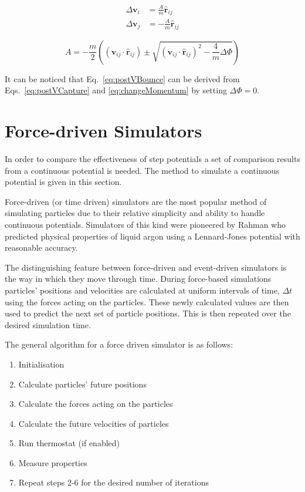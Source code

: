 \documentclass[12pt]{UoAthesis}
\begin{document}
\begin{subequations}
  \label{eq:postVCapture}
  \begin{align}
    \Delta\mathbf{v}_i &= \frac{A}{m} \mathbf{\hat{r}}_{ij} \\
    \Delta\mathbf{v}_j &= -\frac{A}{m}\mathbf{\hat{r}}_{ij}
  \end{align}
\end{subequations}

\begin{equation}
  \label{eq:changeMomentum}
  A = -\frac{m}{2}\left((\mathbf{v}_{ij}\cdot\mathbf{\hat{r}}_{ij}) \pm
  \sqrt{(\mathbf{v}_{ij}\cdot\mathbf{\hat{r}}_{ij})^2 - \frac{4}{m}\Delta \Phi}\right)
\end{equation}

It can be noticed that Eq.~\eqref{eq:postVBounce} can be derived from
Eqs.~\eqref{eq:postVCapture} and \eqref{eq:changeMomentum} by setting
$\Delta \Phi=0$.

 \newpage
\section{Force-driven Simulators} 
In order to compare the effectiveness of step potentials a set of
comparison results from a continuous potential is needed.  The method
to simulate a continuous potential is given in this section.

Force-driven (or time driven) simulators are the most popular method
of simulating particles due to their relative simplicity and ability
to handle continuous potentials. Simulators of this kind were
pioneered by Rahman \cite{Rahman1964} who predicted physical
properties of liquid argon using a Lennard-Jones potential with
reasonable accuracy.

The distinguishing feature between force-driven and event-driven
simulators is the way in which they move through time. During
force-based simulations particles' positions and velocities are
calculated at uniform intervals of time, $\Delta t$ using the forces
acting on the particles. These newly calculated values are then used
to predict the next set of particle positions. This is then repeated
over the desired simulation time.

The general algorithm for a force driven simulator is as follows:
\begin{flushleft}
  \begin{enumerate} 
  \item Initialisation 
  \item Calculate particles' future positions 
  \item Calculate the forces acting on the particles 
  \item Calculate the future velocities of particles 
  \item Run thermostat (if enabled) 
  \item Measure properties 
  \item Repeat steps 2-6 for the desired number of iterations
  \end{enumerate} 
\end{flushleft}
\end{document}
